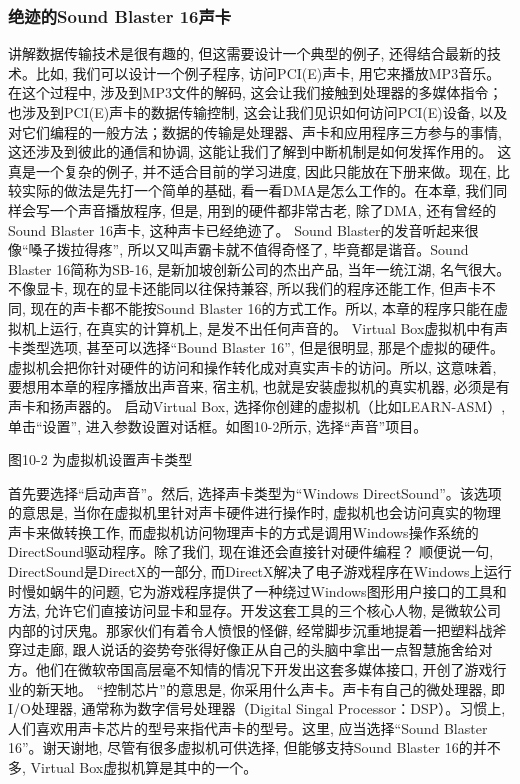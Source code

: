 \documentclass[12pt]{article}
\begin{document}
\begin{CJK}{UTF8}{gbsn}
\subsubsection{绝迹的Sound Blaster 16声卡}
讲解数据传输技术是很有趣的, 但这需要设计一个典型的例子, 还得结合最新的技术。比如, 我们可以设计一个例子程序, 访问PCI(E)声卡, 用它来播放MP3音乐。在这个过程中, 涉及到MP3文件的解码, 这会让我们接触到处理器的多媒体指令；也涉及到PCI(E)声卡的数据传输控制, 这会让我们见识如何访问PCI(E)设备, 以及对它们编程的一般方法；数据的传输是处理器、声卡和应用程序三方参与的事情, 这还涉及到彼此的通信和协调, 这能让我们了解到中断机制是如何发挥作用的。
这真是一个复杂的例子, 并不适合目前的学习进度, 因此只能放在下册来做。现在, 比较实际的做法是先打一个简单的基础, 看一看DMA是怎么工作的。在本章, 我们同样会写一个声音播放程序, 但是, 用到的硬件都非常古老, 除了DMA, 还有曾经的Sound Blaster 16声卡, 这种声卡已经绝迹了。
Sound Blaster的发音听起来很像“嗓子拨拉得疼”, 所以又叫声霸卡就不值得奇怪了, 毕竟都是谐音。Sound Blaster 16简称为SB-16, 是新加坡创新公司的杰出产品, 当年一统江湖, 名气很大。不像显卡, 现在的显卡还能同以往保持兼容, 所以我们的程序还能工作, 但声卡不同, 现在的声卡都不能按Sound Blaster 16的方式工作。所以, 本章的程序只能在虚拟机上运行, 在真实的计算机上, 是发不出任何声音的。
Virtual Box虚拟机中有声卡类型选项, 甚至可以选择“Bound Blaster 16”, 但是很明显, 那是个虚拟的硬件。虚拟机会把你针对硬件的访问和操作转化成对真实声卡的访问。所以, 这意味着, 要想用本章的程序播放出声音来, 宿主机, 也就是安装虚拟机的真实机器, 必须是有声卡和扬声器的。
启动Virtual Box, 选择你创建的虚拟机（比如LEARN-ASM）, 单击“设置”, 进入参数设置对话框。如图10-2所示, 选择“声音”项目。
 
图10-2  为虚拟机设置声卡类型

首先要选择“启动声音”。然后, 选择声卡类型为“Windows DirectSound”。该选项的意思是, 当你在虚拟机里针对声卡硬件进行操作时, 虚拟机也会访问真实的物理声卡来做转换工作, 而虚拟机访问物理声卡的方式是调用Windows操作系统的DirectSound驱动程序。除了我们, 现在谁还会直接针对硬件编程？
顺便说一句, DirectSound是DirectX的一部分, 而DirectX解决了电子游戏程序在Windows上运行时慢如蜗牛的问题, 它为游戏程序提供了一种绕过Windows图形用户接口的工具和方法, 允许它们直接访问显卡和显存。开发这套工具的三个核心人物, 是微软公司内部的讨厌鬼。那家伙们有着令人愤恨的怪僻, 经常脚步沉重地提着一把塑料战斧穿过走廊, 跟人说话的姿势夸张得好像正从自己的头脑中拿出一点智慧施舍给对方。他们在微软帝国高层毫不知情的情况下开发出这套多媒体接口, 开创了游戏行业的新天地。
“控制芯片”的意思是, 你采用什么声卡。声卡有自己的微处理器, 即I/O处理器, 通常称为数字信号处理器（Digital Singal Processor：DSP）。习惯上, 人们喜欢用声卡芯片的型号来指代声卡的型号。这里, 应当选择“Sound Blaster 16”。谢天谢地, 尽管有很多虚拟机可供选择, 但能够支持Sound Blaster 16的并不多, Virtual Box虚拟机算是其中的一个。


\end{CJK}
\end{document}
